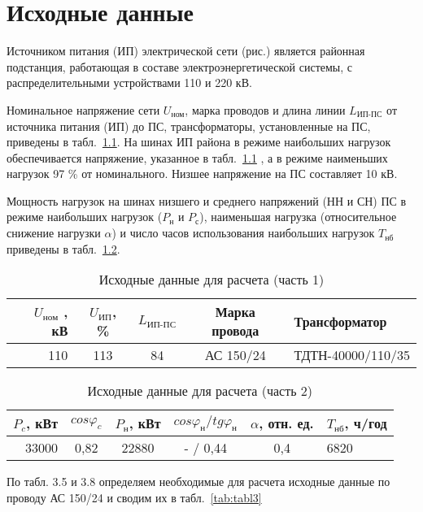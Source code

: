 \chapter{Исходные данные}
\label{cha:data}

Источником питания (ИП) электрической сети (рис.) является районная подстанция, работающая в составе электроэнергетической системы, с распределительными устройствами 110 и 220 кВ.

Номинальное напряжение сети $U_{\text{ном}}$, марка проводов и длина линии $L_{\text{ИП-ПС}}$ от источника питания (ИП) до ПС, трансформаторы, установленные на ПС, приведены в табл.~\ref{tab:tabl1}. На шинах ИП района в режиме наибольших нагрузок обеспечивается напряжение, указанное в табл.~\ref{tab:tabl1} , а в режиме наименьших нагрузок 97 \% от номинального. Низшее напряжение на ПС составляет 10 кВ.

Мощность нагрузок на шинах низшего и среднего напряжений (НН и СН) ПС в режиме наибольших нагрузок ($P_{\text{н}}$ и $P_{\text{с}}$), наименьшая нагрузка (относительное снижение нагрузки $\alpha$) и число часов использования наибольших нагрузок $T_{\text{нб}}$ приведены в табл.~\ref{tab:tabl2}.

\renewcommand{\thetable}{\arabic{table}}
\begin{table}[H]
	\caption{Исходные данные для расчета (часть 1)}
	\begin{tabular}{|r|c|c|c|l|}
		\hline
		$U_{\text{ном}}$ , кВ & $U_{\text{ИП}}$, \% & $L_{\text{ИП-ПС}}$ & Марка провода & Трансформатор \\
		\hline
		110 & 113 & 84 & АС 150/24 & ТДТН-40000/110/35 \\
		\hline
	\end{tabular}
	\label{tab:tabl1}
\end{table}

\begin{table}[H]
	\caption{Исходные данные для расчета (часть 2)}
	\begin{tabular}{|r|c|c|c|c|l|}
		\hline
		$P_{c}$, кВт & $cos\varphi_c$ & $P_{\text{н}}$, кВт & $cos\varphi_{\text{н}} / tg\varphi_{\text{н}} $ & $\alpha$, отн. ед. & $T_{\text{нб}}$, ч/год \\
		\hline
		33000 & 0,82 & 22880 & - / 0,44 & 0,4 & 6820 \\
		\hline
	\end{tabular}
	\label{tab:tabl2}
\end{table}

По табл. 3.5 и 3.8  определяем необходимые для расчета исходные данные по проводу АС 150/24 и сводим их в табл.~\ref{tab:tabl3}

